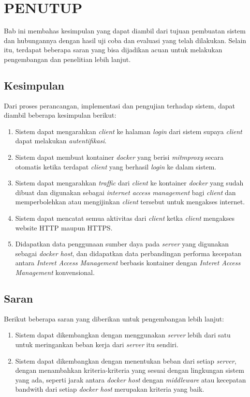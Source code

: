 \chapter{PENUTUP}
    Bab ini membahas kesimpulan yang dapat diambil dari tujuan pembuatan sistem dan hubungannya dengan hasil uji coba dan evaluasi yang telah dilakukan. Selain itu, terdapat beberapa saran yang bisa dijadikan acuan untuk melakukan pengembangan dan penelitian lebih lanjut.
        
\section{Kesimpulan}
Dari proses perancangan, implementasi dan pengujian terhadap sistem, dapat diambil beberapa kesimpulan berikut:
\begin{enumerate}
\item Sistem dapat mengarahkan \textit{client} ke halaman \textit{login} dari sistem supaya \textit{client} dapat melakukan \textit{autentifikasi}.
\item Sistem dapat membuat kontainer \textit{docker} yang berisi \textit{mitmproxy} secara otomatis ketika terdapat \textit{client} yang berhasil \textit{login} ke dalam sistem.
\item Sistem dapat mengarahkan \textit{traffic} dari \textit{client} ke kontainer \textit{docker} yang sudah dibuat dan digunakan sebagai \textit{internet access management} bagi \textit{client} dan memperbolehkan atau mengijinkan \textit{client} tersebut untuk mengakses internet.
\item Sistem dapat mencatat semua aktivitas dari \textit{client} ketka \textit{client} mengakses website HTTP maupun HTTPS.
\item Didapatkan data penggunaan sumber daya pada \textit{server} yang digunakan sebagai \textit{docker host}, dan didapatkan data perbandingan performa kecepatan antara \textit{Interet Access Management} berbasis kontainer dengan \textit{Interet Access Management} konvensional.
\end{enumerate}

\section{Saran}
Berikut beberapa saran yang diberikan untuk pengembangan lebih lanjut:
\begin{enumerate}
\item Sistem dapat dikembangkan dengan menggunakan \textit{server} lebih dari satu untuk meringankan beban kerja dari \textit{server} itu sendiri.
\item Sistem dapat dikembangkan dengan menentukan beban dari setiap \textit{server}, dengan menambahkan kriteria-kriteria yang sesuai dengan lingkungan sistem yang ada, seperti jarak antara \textit{docker host} dengan \textit{middleware} atau kecepatan bandwith dari setiap \textit{docker host} merupakan kriteria yang baik. 
\end{enumerate}